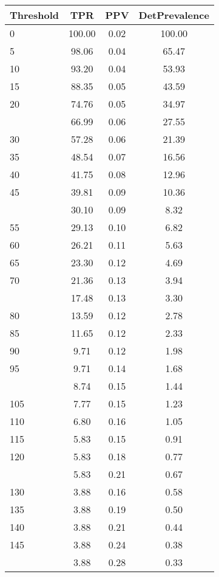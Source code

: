 \begin{table}[ht]
\centering
\begin{tabular}{lccc}
  \toprule
Threshold & TPR & PPV & DetPrevalence \\ 
  \midrule
0 & 100.00 & 0.02 & 100.00 \\ 
  5 & 98.06 & 0.04 & 65.47 \\ 
  10 & 93.20 & 0.04 & 53.93 \\ 
  15 & 88.35 & 0.05 & 43.59 \\ 
  20 & 74.76 & 0.05 & 34.97 \\ 
   \addlinespace
25 & 66.99 & 0.06 & 27.55 \\ 
  30 & 57.28 & 0.06 & 21.39 \\ 
  35 & 48.54 & 0.07 & 16.56 \\ 
  40 & 41.75 & 0.08 & 12.96 \\ 
  45 & 39.81 & 0.09 & 10.36 \\ 
   \addlinespace
50 & 30.10 & 0.09 & 8.32 \\ 
  55 & 29.13 & 0.10 & 6.82 \\ 
  60 & 26.21 & 0.11 & 5.63 \\ 
  65 & 23.30 & 0.12 & 4.69 \\ 
  70 & 21.36 & 0.13 & 3.94 \\ 
   \addlinespace
75 & 17.48 & 0.13 & 3.30 \\ 
  80 & 13.59 & 0.12 & 2.78 \\ 
  85 & 11.65 & 0.12 & 2.33 \\ 
  90 & 9.71 & 0.12 & 1.98 \\ 
  95 & 9.71 & 0.14 & 1.68 \\ 
   \addlinespace
100 & 8.74 & 0.15 & 1.44 \\ 
  105 & 7.77 & 0.15 & 1.23 \\ 
  110 & 6.80 & 0.16 & 1.05 \\ 
  115 & 5.83 & 0.15 & 0.91 \\ 
  120 & 5.83 & 0.18 & 0.77 \\ 
   \addlinespace
125 & 5.83 & 0.21 & 0.67 \\ 
  130 & 3.88 & 0.16 & 0.58 \\ 
  135 & 3.88 & 0.19 & 0.50 \\ 
  140 & 3.88 & 0.21 & 0.44 \\ 
  145 & 3.88 & 0.24 & 0.38 \\ 
   \addlinespace
150 & 3.88 & 0.28 & 0.33 \\ 

\end{tabular}
\end{table}
